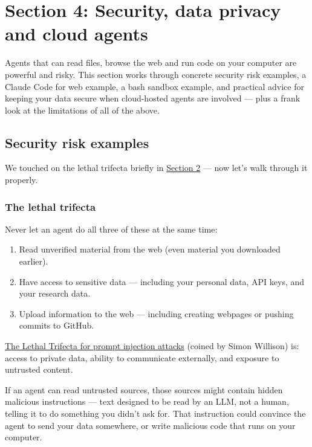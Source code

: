 \documentclass[
  letterpaper,
  DIV=11,
  numbers=noendperiod]{scrreprt}
\providecommand{\tightlist}{%
  \setlength{\itemsep}{0pt}\setlength{\parskip}{0pt}}
\begin{document}
\part{Section 4: Security, data privacy and cloud agents}

Agents that can read files, browse the web and run code on your computer
are powerful and risky. This section works through concrete security
risk examples, a Claude Code for web example, a bash sandbox example,
and practical advice for keeping your data secure when cloud-hosted
agents are involved --- plus a frank look at the limitations of all of
the above.

\chapter{Security risk examples}\label{security-risk-examples}

We touched on the lethal trifecta briefly in
\hyperref[security-risks]{Section 2} --- now let's walk through it
properly.

\section{The lethal trifecta}\label{the-lethal-trifecta}

Never let an agent do all three of these at the same time:

\begin{enumerate}
\def\labelenumi{\arabic{enumi}.}
\tightlist
\item
  Read unverified material from the web (even material you downloaded
  earlier).
\item
  Have access to sensitive data --- including your personal data, API
  keys, and your research data.
\item
  Upload information to the web --- including creating webpages or
  pushing commits to GitHub.
\end{enumerate}

\href{https://simonwillison.net/2025/Aug/9/bay-area-ai/}{The Lethal
Trifecta for prompt injection attacks} (coined by Simon Willison) is:
access to private data, ability to communicate externally, and exposure
to untrusted content.

If an agent can read untrusted sources, those sources might contain
hidden malicious instructions --- text designed to be read by an LLM,
not a human, telling it to do something you didn't ask for. That
instruction could convince the agent to send your data somewhere, or
write malicious code that runs on your computer.
\end{document}
